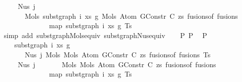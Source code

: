 \begin{isabellebody}
\ \ \ \ \ Nus{}\ j\isanewline
\ \ \ \ \ \ \ {\isacharparenleft}{\kern0pt}Mols{}\ {\isacharparenleft}{\kern0pt}subst{\isacharunderscore}{\kern0pt}graph\ i\ xs\ g{}\ {\isacharparenleft}{\kern0pt}Mols{}\ {\isacharparenleft}{\kern0pt}Atom\ {\isacharparenleft}{\kern0pt}GConstr\ C{\isacharparenright}{\kern0pt}\ zs{\isacharparenright}{\kern0pt}\ {\isacharparenleft}{\kern0pt}fusions{\isacharunderscore}{\kern0pt}of\ fusions{\isacharparenright}{\kern0pt}{\isacharparenright}{\kern0pt}{\isacharparenright}{\kern0pt}\isanewline
\ \ \ \ \ \ \ \ \ \ \ \ \ \ {\isacharparenleft}{\kern0pt}map\ {\isacharparenleft}{\kern0pt}subst{\isacharunderscore}{\kern0pt}graph\ i\ xs\ g{}{\isacharparenright}{\kern0pt}\ Ts{\isacharparenright}{\kern0pt}{\isacharparenright}{\kern0pt}{\isachardoublequoteclose}\isanewline
\ \ \ \ \isamarkupfalse%
\ {\isacharparenleft}{\kern0pt}simp\ add{\isacharcolon}{\kern0pt}\ subst{\isacharunderscore}{\kern0pt}graph{\isacharunderscore}{\kern0pt}Mols{}{\isacharunderscore}{\kern0pt}equiv\ subst{\isacharunderscore}{\kern0pt}graph{\isacharunderscore}{\kern0pt}Nus{}{\isacharunderscore}{\kern0pt}equiv{\isacharparenright}{\kern0pt}\isanewline
\isanewline
\isanewline
\ \ \isamarkupfalse%
\ P{}\ P{}\ \isamarkupfalse%
\ P{}{\isacharcolon}{\kern0pt}\isanewline
\ \ \ \ {\isachardoublequoteopen}subst{\isacharunderscore}{\kern0pt}graph\ i\ xs\ g{}\isanewline
\ \ \ \ \ \ \ {\isacharparenleft}{\kern0pt}Nus{}\ j\ {\isacharparenleft}{\kern0pt}Mols{}\ {\isacharparenleft}{\kern0pt}Mols{}\ {\isacharparenleft}{\kern0pt}Atom\ {\isacharparenleft}{\kern0pt}GConstr\ C{\isacharparenright}{\kern0pt}\ zs{\isacharparenright}{\kern0pt}\ {\isacharparenleft}{\kern0pt}fusions{\isacharunderscore}{\kern0pt}of\ fusions{\isacharparenright}{\kern0pt}{\isacharparenright}{\kern0pt}\ Ts{\isacharparenright}{\kern0pt}{\isacharparenright}{\kern0pt}\ {\isacharequal}{\kern0pt}\isanewline
\ \ \ \ \ Nus{}\ j\isanewline
\ \ \ \ \ \ \ {\isacharparenleft}{\kern0pt}Mols{}\ {\isacharparenleft}{\kern0pt}Mols{}\ {\isacharparenleft}{\kern0pt}Atom\ {\isacharparenleft}{\kern0pt}GConstr\ C{\isacharparenright}{\kern0pt}\ zs{\isacharparenright}{\kern0pt}\ {\isacharparenleft}{\kern0pt}fusions{\isacharunderscore}{\kern0pt}of\ fusions{\isacharparenright}{\kern0pt}{\isacharparenright}{\kern0pt}\isanewline
\ \ \ \ \ \ \ \ \ \ \ \ \ \ {\isacharparenleft}{\kern0pt}map\ {\isacharparenleft}{\kern0pt}subst{\isacharunderscore}{\kern0pt}graph\ i\ xs\ g{}{\isacharparenright}{\kern0pt}\ Ts{\isacharparenright}{\kern0pt}{\isacharparenright}{\kern0pt}{\isachardoublequoteclose}\isanewline

\end{isabellebody}

